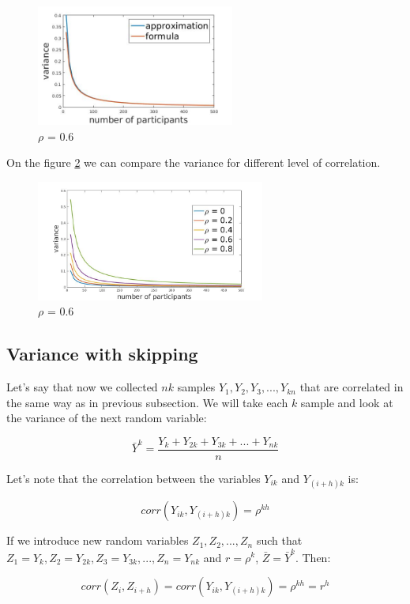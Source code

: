 \documentclass[12pt]{report}
\begin{document}
\begin{figure}[ht]
    \centering
    \includegraphics[height=150px]{lineGame1}
    \caption{ $\rho$ = 0.6 }
    \label{fig:lineGame1}
\end{figure}

On the figure \ref{fig:diffCorr} we can compare the variance for different level of correlation.


\begin{figure}[ht]
    \centering
    \includegraphics[height=150px]{varianceIndDep2}
    \caption{ $\rho$ = 0.6 }
    \label{fig:diffCorr}
\end{figure}


\subsection{Variance with skipping}

Let's say that now we collected $nk$ samples $Y_1, Y_2, Y_3, ..., Y_{kn}$ that are correlated in the same way as in previous subsection. We  will take each $k$ sample and look at the variance of the next random variable:

$$\bar{Y}^k = \frac{Y_k + Y_{2k} + Y_{3k} + ... + Y_{nk}}{n}$$

Let's note that the correlation between the variables $Y_{ik}$ and $Y_{(i+h)k}$ is: 

 $$corr(Y_{ik}, Y_{(i+h)k}) = \rho^{kh}$$

If we introduce new random variables $Z_1, Z_2, ..., Z_n$ such that $Z_1 = Y_k, Z_2 = Y_{2k}, Z_3 = Y_{3k},..., Z_n = Y_{nk}$ and $r = \rho^k$, $\bar{Z}= \bar{Y}^k$. Then:

$$corr(Z_i, Z_{i+h}) = corr(Y_{ik}, Y_{(i+h)k}) = \rho^{kh} = r^h$$
\end{document}
